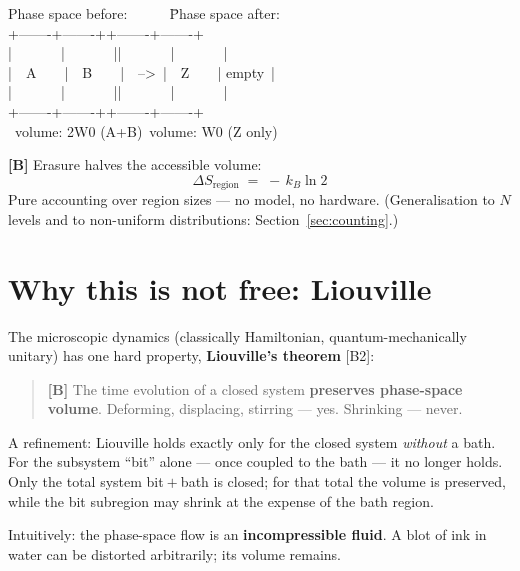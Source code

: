 \begin{center}
\begin{minipage}{0.78\textwidth}
\ttfamily\small
\begin{tabbing}
Phase space before:\ \ \ \ \ \ \=Phase space after:\\[0.3em]
+-------+-------+\>+-------+-------+\\
|\ \ \ \ \ \ \ |\ \ \ \ \ \ \ |\>|\ \ \ \ \ \ \ |\ \ \ \ \ \ \ |\\
|\ \ A\ \ \ \ |\ \ B\ \ \ \ |\ \ -->\ \>|\ \ Z\ \ \ \ | empty\ |\\
|\ \ \ \ \ \ \ |\ \ \ \ \ \ \ |\>|\ \ \ \ \ \ \ |\ \ \ \ \ \ \ |\\
+-------+-------+\>+-------+-------+\\
\ volume: 2W0 (A+B)\>\ volume: W0 (Z only)
\end{tabbing}
\end{minipage}
\end{center}

\textbf{[B]} Erasure halves the accessible volume:
\[
  \Delta S_{\text{region}} \;=\; -\,k_B \ln 2
\]
Pure accounting over region sizes --- no model, no hardware. (Generalisation to
$N$ levels and to non-uniform distributions: Section~\ref{sec:counting}.)

\section{Why this is not free: Liouville}
\label{sec:liouville}

The microscopic dynamics (classically Hamiltonian, quantum-mechanically unitary)
has one hard property, \textbf{Liouville's theorem} [B2]:

\begin{quote}
\textbf{[B]} The time evolution of a closed system \textbf{preserves phase-space volume}.
Deforming, displacing, stirring --- yes. Shrinking --- never.
\end{quote}

A refinement: Liouville holds exactly only for the closed system \emph{without} a
bath. For the subsystem “bit” alone --- once coupled to the bath --- it no longer
holds. Only the total system bit${}+{}$bath is closed; for that total the volume
is preserved, while the bit subregion may shrink at the expense of the bath
region.

Intuitively: the phase-space flow is an \textbf{incompressible fluid}. A blot of
ink in water can be distorted arbitrarily; its volume remains.

